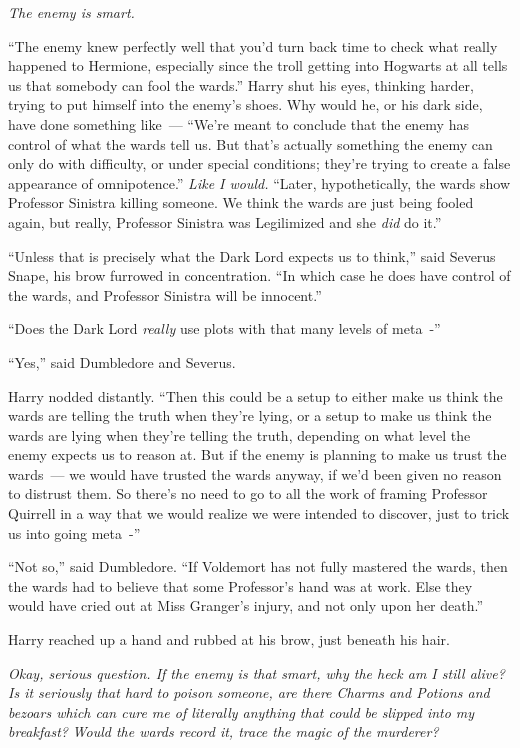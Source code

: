 \emph{The enemy is smart.}

``The enemy knew perfectly well that you'd turn back time to check what really happened to Hermione, especially since the troll getting into Hogwarts at all tells us that somebody can fool the wards.'' Harry shut his eyes, thinking harder, trying to put himself into the enemy's shoes. Why would he, or his dark side, have done something like~--- ``We're meant to conclude that the enemy has control of what the wards tell us. But that's actually something the enemy can only do with difficulty, or under special conditions; they're trying to create a false appearance of omnipotence.'' \emph{Like I would.} ``Later, hypothetically, the wards show Professor Sinistra killing someone. We think the wards are just being fooled again, but really, Professor Sinistra was Legilimized and she \emph{did} do it.''

``Unless that is precisely what the Dark Lord expects us to think,'' said Severus Snape, his brow furrowed in concentration. ``In which case he does have control of the wards, and Professor Sinistra will be innocent.''

``Does the Dark Lord \emph{really} use plots with that many levels of meta~-''

``Yes,'' said Dumbledore and Severus.

Harry nodded distantly. ``Then this could be a setup to either make us think the wards are telling the truth when they're lying, or a setup to make us think the wards are lying when they're telling the truth, depending on what level the enemy expects us to reason at. But if the enemy is planning to make us trust the wards~--- we would have trusted the wards anyway, if we'd been given no reason to distrust them. So there's no need to go to all the work of framing Professor Quirrell in a way that we would realize we were intended to discover, just to trick us into going meta~-''

``Not so,'' said Dumbledore. ``If Voldemort has not fully mastered the wards, then the wards had to believe that some Professor's hand was at work. Else they would have cried out at Miss Granger's injury, and not only upon her death.''

Harry reached up a hand and rubbed at his brow, just beneath his hair.

\emph{Okay, serious question. If the enemy is that smart, why the heck am I still alive? Is it seriously that hard to poison someone, are there Charms and Potions and bezoars which can cure me of literally anything that could be slipped into my breakfast?} \emph{Would the wards record it, trace the magic of the murderer?}

